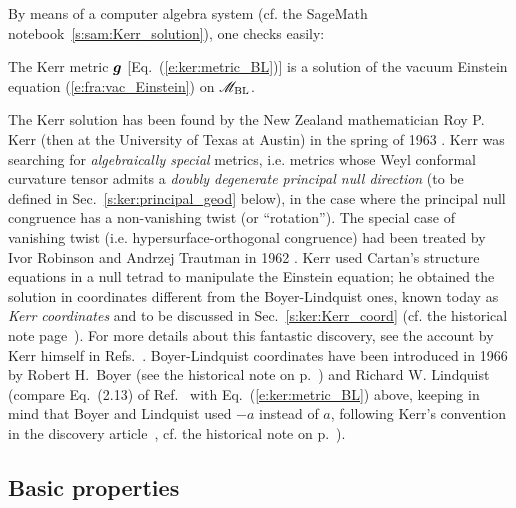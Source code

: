 By means of a computer algebra system (cf. the SageMath notebook~\ref{s:sam:Kerr_solution}),
one checks easily:
\begin{prop}
The Kerr metric $\bm{g}$ [Eq.~(\ref{e:ker:metric_BL})] is a solution of the vacuum
Einstein equation
(\ref{e:fra:vac_Einstein}) on $\mathscr{M}_{\rm BL}$.
\end{prop}

\begin{hist}
\label{h:ker:Kerr_sol}
The Kerr solution has been found by the New Zealand mathematician Roy P. Kerr (then at the University of Texas at Austin) in the spring of 1963
\cite{Kerr63}. Kerr was searching for \emph{algebraically special} metrics, i.e. metrics whose Weyl conformal curvature
tensor admits a \emph{doubly degenerate principal null direction} (to be defined
in Sec.~\ref{s:ker:principal_geod} below), in the case where the
principal null congruence has a non-vanishing twist (or ``rotation''). The special case of vanishing twist (i.e. hypersurface-orthogonal
congruence) had been treated by Ivor Robinson and
Andrzej Trautman in 1962 \cite{RobinT62}.
Kerr used
Cartan's structure equations in a null tetrad
to manipulate the Einstein equation; he obtained the solution in coordinates different from the Boyer-Lindquist ones, known today as \emph{Kerr coordinates} and
to be discussed in Sec.~\ref{s:ker:Kerr_coord} (cf. the historical note page~\pageref{h:ker:Kerr_coord}). For more details about this fantastic discovery, see the
account by Kerr himself in Refs.~\cite{Kerr09,KrasiVK09}.
Boyer-Lindquist coordinates have been introduced in 1966 by Robert H.~Boyer (see the historical note on p.~\pageref{h:sta:Boyer}) and Richard W. Lindquist \cite{BoyerL67} (compare Eq.~(2.13) of Ref.~\cite{BoyerL67} with
Eq.~(\ref{e:ker:metric_BL}) above, keeping in mind that Boyer and Lindquist used
$-a$ instead of $a$, following Kerr's convention in the discovery article~\cite{Kerr63}, cf.
the historical note on p.~\pageref{h:ker:Kerr_coord}).
\end{hist}

\subsection{Basic properties} \label{s:ker:basic_prop}

